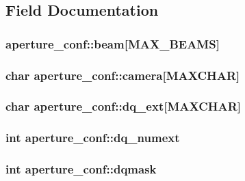 \subsection{Field Documentation}
\hypertarget{structaperture__conf_aa1f52d8496707cab4631dc2369d3dec2}{
\subsubsection[{beam}]{ {\bf aperture\_\-conf::beam}\mbox{[}MAX\_\-BEAMS\mbox{]}}}
\label{structaperture__conf_aa1f52d8496707cab4631dc2369d3dec2}
\hypertarget{structaperture__conf_a4301fafaf135241f0c8c778a706bdd58}{
\subsubsection[{camera}]{\setlength{\rightskip}{0pt plus 5cm}char {\bf aperture\_\-conf::camera}\mbox{[}MAXCHAR\mbox{]}}}
\label{structaperture__conf_a4301fafaf135241f0c8c778a706bdd58}
\hypertarget{structaperture__conf_a66ddf8ad2650f4d22681e58456736c04}{
\subsubsection[{dq\_\-ext}]{\setlength{\rightskip}{0pt plus 5cm}char {\bf aperture\_\-conf::dq\_\-ext}\mbox{[}MAXCHAR\mbox{]}}}
\label{structaperture__conf_a66ddf8ad2650f4d22681e58456736c04}
\hypertarget{structaperture__conf_ae70427981472e0bcbfbf5726ee9646b1}{
\subsubsection[{dq\_\-numext}]{\setlength{\rightskip}{0pt plus 5cm}int {\bf aperture\_\-conf::dq\_\-numext}}}
\label{structaperture__conf_ae70427981472e0bcbfbf5726ee9646b1}
\hypertarget{structaperture__conf_a17945ab6b730d7298298e077df799f2c}{
\subsubsection[{dqmask}]{\setlength{\rightskip}{0pt plus 5cm}int {\bf aperture\_\-conf::dqmask}}}
